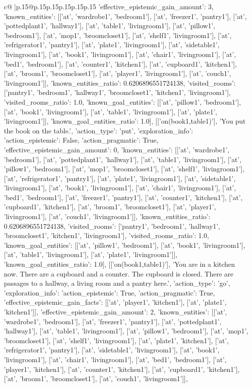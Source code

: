 \documentclass{article}
\begin{document}
{\begin{supertabular}{c@{$\;$}|p{.15\linewidth}@{}p{.15\linewidth}p{.15\linewidth}p{.15\linewidth}p{.15\linewidth}p{.15\linewidth}}
{{{'effective_epistemic_gain_amount': 3, 'known_entities': [['at', 'wardrobe1', 'bedroom1'], ['at', 'freezer1', 'pantry1'], ['at', 'pottedplant1', 'hallway1'], ['at', 'table1', 'livingroom1'], ['at', 'pillow1', 'bedroom1'], ['at', 'mop1', 'broomcloset1'], ['at', 'shelf1', 'livingroom1'], ['at', 'refrigerator1', 'pantry1'], ['at', 'plate1', 'livingroom1'], ['at', 'sidetable1', 'livingroom1'], ['at', 'book1', 'livingroom1'], ['at', 'chair1', 'livingroom1'], ['at', 'bed1', 'bedroom1'], ['at', 'counter1', 'kitchen1'], ['at', 'cupboard1', 'kitchen1'], ['at', 'broom1', 'broomcloset1'], ['at', 'player1', 'livingroom1'], ['at', 'couch1', 'livingroom1']], 'known_entities_ratio': 0.6206896551724138, 'visited_rooms': ['pantry1', 'bedroom1', 'hallway1', 'broomcloset1', 'kitchen1', 'livingroom1'], 'visited_rooms_ratio': 1.0, 'known_goal_entities': [['at', 'pillow1', 'bedroom1'], ['at', 'book1', 'livingroom1'], ['at', 'table1', 'livingroom1'], ['at', 'plate1', 'livingroom1']], 'known_goal_entities_ratio': 1.0}}], [['on(book1,table1)'], 'You put the book on the table.', {'action_type': 'put', 'exploration_info': {'action_epistemic': False, 'action_pragmatic': True, 'effective_epistemic_gain_amount': 0, 'known_entities': [['at', 'wardrobe1', 'bedroom1'], ['at', 'pottedplant1', 'hallway1'], ['at', 'table1', 'livingroom1'], ['at', 'pillow1', 'bedroom1'], ['at', 'mop1', 'broomcloset1'], ['at', 'shelf1', 'livingroom1'], ['at', 'refrigerator1', 'pantry1'], ['at', 'plate1', 'livingroom1'], ['at', 'sidetable1', 'livingroom1'], ['at', 'book1', 'livingroom1'], ['at', 'chair1', 'livingroom1'], ['at', 'bed1', 'bedroom1'], ['at', 'freezer1', 'pantry1'], ['at', 'counter1', 'kitchen1'], ['at', 'cupboard1', 'kitchen1'], ['at', 'broom1', 'broomcloset1'], ['at', 'player1', 'livingroom1'], ['at', 'couch1', 'livingroom1']], 'known_entities_ratio': 0.6206896551724138, 'visited_rooms': ['pantry1', 'bedroom1', 'hallway1', 'broomcloset1', 'kitchen1', 'livingroom1'], 'visited_rooms_ratio': 1.0, 'known_goal_entities': [['at', 'pillow1', 'bedroom1'], ['at', 'book1', 'livingroom1'], ['at', 'table1', 'livingroom1'], ['at', 'plate1', 'livingroom1']], 'known_goal_entities_ratio': 1.0}}], [['on(book1,table1)'], 'You are in a kitchen now. There are a cupboard and a counter. The cupboard is closed. There are passages to a hallway, a living room and a pantry here.', {'action_type': 'go', 'exploration_info': {'action_epistemic': True, 'action_pragmatic': True, 'effective_epistemic_gain_facts': [['at', 'player1', 'kitchen1'], ['at', 'plate1', 'kitchen1']], 'effective_epistemic_gain_amount': 2, 'known_entities': [['at', 'wardrobe1', 'bedroom1'], ['at', 'freezer1', 'pantry1'], ['at', 'pottedplant1', 'hallway1'], ['at', 'table1', 'livingroom1'], ['at', 'pillow1', 'bedroom1'], ['at', 'mop1', 'broomcloset1'], ['at', 'shelf1', 'livingroom1'], ['at', 'plate1', 'kitchen1'], ['at', 'refrigerator1', 'pantry1'], ['at', 'sidetable1', 'livingroom1'], ['at', 'book1', 'livingroom1'], ['at', 'chair1', 'livingroom1'], ['at', 'bed1', 'bedroom1'], ['at', 'player1', 'kitchen1'], ['at', 'counter1', 'kitchen1'], ['at', 'cupboard1', 'kitchen1'], ['at', 'broom1', 'broomcloset1'], ['at', 'couch1', 'livingroom1']], }}}
\end{supertabular}}
\end{document}
